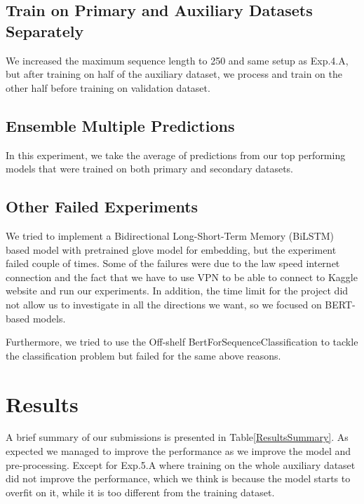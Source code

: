 \documentclass[10pt,twocolumn,letterpaper]{article}
\begin{document}
\subsection{Train on Primary and Auxiliary Datasets Separately} 

We increased the maximum sequence length to 250 and same setup as Exp.4.A, but after training on half of the auxiliary dataset, we process and train on the other half before training on validation dataset.

\subsection{Ensemble Multiple Predictions}

In this experiment, we take the average of predictions from our top performing models that were trained on both primary and secondary datasets. 

\subsection{Other Failed Experiments}
We tried to implement a Bidirectional Long-Short-Term Memory (BiLSTM) based model with pretrained glove model for embedding, but the experiment failed couple of times. Some of the failures were due to the law speed internet  connection and the fact that we have to use VPN to be able to connect to Kaggle website and run our experiments. In addition, the time limit for the project did not allow us to investigate in all the directions we want, so we focused on BERT-based models.

Furthermore, we tried to use the Off-shelf BertForSequenceClassification to tackle the classification problem but failed for the same above reasons.   

 
\section{Results}
A brief summary of our submissions is presented in Table\ref{ResultsSummary}. As expected we managed to improve the performance as we improve the model and pre-processing. Except for Exp.5.A where training on the whole auxiliary dataset did not  improve the performance, which we think is because the model starts to overfit on it, while it is too different from the training dataset. 
\end{document}
